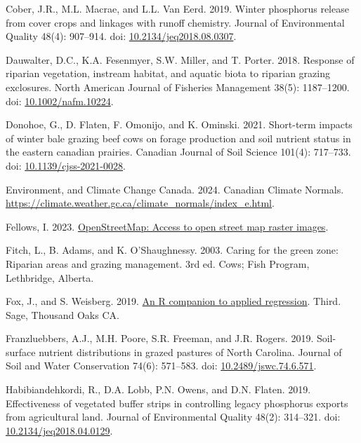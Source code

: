 \documentclass[
]{agujournal2019}
\newlength{\cslhangindent}
\newenvironment{CSLReferences}[2] %
 {\begin{list}{}{%
  \setlength{\itemindent}{0pt}
  \setlength{\leftmargin}{0pt}
  \setlength{\parsep}{0pt}
  \ifodd #1
   \setlength{\leftmargin}{\cslhangindent}
   \setlength{\itemindent}{-1\cslhangindent}
  \fi
  \setlength{\itemsep}{#2\baselineskip}}}
 {\end{list}}
\begin{document}
\begin{CSLReferences}{1}{1}
Cober, J.R., M.L. Macrae, and L.L. Van Eerd. 2019. Winter phosphorus
release from cover crops and linkages with runoff chemistry. Journal of
Environmental Quality 48(4): 907--914. doi:
\href{https://doi.org/10.2134/jeq2018.08.0307}{10.2134/jeq2018.08.0307}.

Dauwalter, D.C., K.A. Fesenmyer, S.W. Miller, and T. Porter. 2018.
Response of riparian vegetation, instream habitat, and aquatic biota to
riparian grazing exclosures. North American Journal of Fisheries
Management 38(5): 1187--1200. doi:
\href{https://doi.org/10.1002/nafm.10224}{10.1002/nafm.10224}.

Donohoe, G., D. Flaten, F. Omonijo, and K. Ominski. 2021. Short-term
impacts of winter bale grazing beef cows on forage production and soil
nutrient status in the eastern canadian prairies. Canadian Journal of
Soil Science 101(4): 717--733. doi:
\href{https://doi.org/10.1139/cjss-2021-0028}{10.1139/cjss-2021-0028}.

Environment, and Climate Change Canada. 2024. Canadian Climate Normals.
\url{https://climate.weather.gc.ca/climate_normals/index_e.html}.

Fellows, I. 2023.
\href{https://CRAN.R-project.org/package=OpenStreetMap}{OpenStreetMap:
Access to open street map raster images}.

Fitch, L., B. Adams, and K. O'Shaughnessy. 2003. Caring for the green
zone: Riparian areas and grazing management. 3rd ed. Cows; Fish Program,
Lethbridge, Alberta.

Fox, J., and S. Weisberg. 2019.
\href{https://socialsciences.mcmaster.ca/jfox/Books/Companion/}{An {R}
companion to applied regression}. Third. Sage, Thousand Oaks {CA}.

Franzluebbers, A.J., M.H. Poore, S.R. Freeman, and J.R. Rogers. 2019.
Soil-surface nutrient distributions in grazed pastures of North
Carolina. Journal of Soil and Water Conservation 74(6): 571--583. doi:
\href{https://doi.org/10.2489/jswc.74.6.571}{10.2489/jswc.74.6.571}.

Habibiandehkordi, R., D.A. Lobb, P.N. Owens, and D.N. Flaten. 2019.
Effectiveness of vegetated buffer strips in controlling legacy
phosphorus exports from agricultural land. Journal of Environmental
Quality 48(2): 314--321. doi:
\href{https://doi.org/10.2134/jeq2018.04.0129}{10.2134/jeq2018.04.0129}.


\end{CSLReferences}
\end{document}
